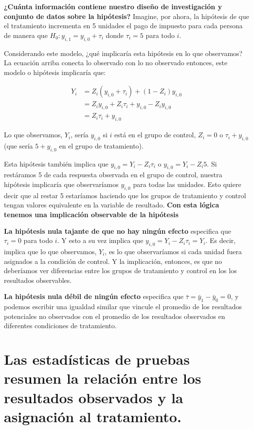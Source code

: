 \documentclass[
]{article}
\begin{document}
\textbf{¿Cuánta información contiene nuestro diseño de investigación y conjunto de datos sobre la hipótesis?} Imagine, por ahora, la hipótesis de que el tratamiento incrementa en 5 unidades el pago de impuesto para cada persona de manera que \(H_0: y_{i, 1} = y_{i, 0} + \tau_i\) donde \(\tau_i = 5\) para todo \(i\).

Considerando este modelo, ¿qué implicaría esta hipótesis en lo que observamos? La ecuación arriba conecta lo observado con lo no observado entonces, este modelo o hipótesis implicaría que:

\[\begin{aligned}  Y_i & = Z_i ( y_{i,0} + \tau_i ) + ( 1 - Z_i) y_{i,0} \\
& = Z_i  y_{i,0} + Z_i \tau_i + y_{i,0} - Z_i y_{i,0} \\
& = Z_i \tau_i  + y_{i,0}
\end{aligned}\]

Lo que observamos, \(Y_i\), sería \(y_{i,0}\) si \(i\) está en el grupo de control,
\(Z_i=0\) o \(\tau_i + y_{i,0}\) (que sería \(5 + y_{i,0}\) en el grupo de tratamiento).

Esta hipótesis también implica que \(y_{i,0} = Y_i - Z_i \tau_i\) o \(y_{i,0} = Y_i - Z_i 5\). Si restáramos 5 de cada respuesta observada en el grupo de control, nuestra hipótesis implicaría que observaríamos \(y_{i,0}\) para todas las unidades. Esto quiere decir que al restar 5 estaríamos haciendo que los grupos de tratamiento y control tengan valores equivalente en la variable de resultado. \textbf{Con esta lógica tenemos una implicación observable de la hipótesis}

\textbf{La hipótesis nula tajante de que no hay ningún efecto} especifica que \(\tau_i = 0\) para todo \(i\). Y esto a su vez implica que \(y_{i, 0} = Y_i - Z_i \tau_i = Y_i\). Es decir, implica que lo que observamos, \(Y_i\), es lo que observaríamos si cada
unidad fuera asignados a la condición de control. Y la implicación, entonces, es que no deberíamos ver diferencias entre los grupos de tratamiento y control en los
los resultados observables.

\textbf{La hipótesis nula débil de ningún efecto} especifica que
\(\bar{\tau} = \bar{y}_{1} - \bar{y} _0 =0\), y podemos escribir una igualdad similar que vincule el promedio de los resultados potenciales no observados con el promedio
de los resultados observados en diferentes condiciones de tratamiento.

\hypertarget{las-estaduxedsticas-de-pruebas-resumen-la-relaciuxf3n-entre-los-resultados-observados-y-la-asignaciuxf3n-al-tratamiento.}{%
\section{Las estadísticas de pruebas resumen la relación entre los resultados observados y la asignación al tratamiento.}\label{las-estaduxedsticas-de-pruebas-resumen-la-relaciuxf3n-entre-los-resultados-observados-y-la-asignaciuxf3n-al-tratamiento.}}
\end{document}
